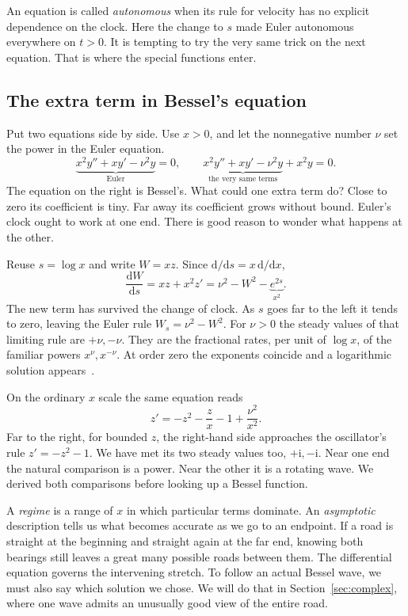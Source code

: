 \documentclass[11pt,a4paper]{amsart}
\newcommand{\dif}{\mathrm{d}}
\newcommand{\ii}{\mathrm{i}}
\theoremstyle{definition}
\theoremstyle{remark}
\begin{document}
An equation is called \emph{autonomous} when its rule for velocity has no explicit dependence on the clock. Here the change to \(s\) made Euler autonomous everywhere on \(t>0\). It is tempting to try the very same trick on the next equation. That is where the special functions enter.

\subsection{The extra term in Bessel's equation}
Put two equations side by side. Use \(x>0\), and let the nonnegative number \(\nu\) set the power in the Euler equation.
\[
 \underbrace{x^2y''+xy'-\nu^2y}_{\text{Euler}}=0,
 \qquad
 \underbrace{x^2y''+xy'-\nu^2y}_{\text{the very same terms}}+x^2y=0.
\]
The equation on the right is Bessel's. What could one extra term do? Close to zero its coefficient is tiny. Far away its coefficient grows without bound. Euler's clock ought to work at one end. There is good reason to wonder what happens at the other.

Reuse \(s=\log x\) and write \(W=xz\). Since \(\dif/\dif s=x\,\dif/\dif x\),
\[
 \frac{\dif W}{\dif s}=xz+x^2z'
       =\nu^2-W^2-\underbrace{e^{2s}}_{x^2}.
\]
The new term has survived the change of clock. As \(s\) goes far to the left it tends to zero, leaving the Euler rule \(W_s=\nu^2-W^2\). For \(\nu>0\) the steady values of that limiting rule are \(+\nu,-\nu\). They are the fractional rates, per unit of \(\log x\), of the familiar powers \(x^\nu,x^{-\nu}\). At order zero the exponents coincide and a logarithmic solution appears~\cite{NISTBessel}.

On the ordinary \(x\) scale the same equation reads
\begin{equation}\label{eq:besselslope}
 z'=-z^2-\frac{z}{x}-1+\frac{\nu^2}{x^2}.
\end{equation}
Far to the right, for bounded \(z\), the right-hand side approaches the oscillator's rule \(z'=-z^2-1\). We have met its two steady values too, \(+\ii,-\ii\). Near one end the natural comparison is a power. Near the other it is a rotating wave. We derived both comparisons before looking up a Bessel function.

A \emph{regime} is a range of \(x\) in which particular terms dominate. An \emph{asymptotic} description tells us what becomes accurate as we go to an endpoint. If a road is straight at the beginning and straight again at the far end, knowing both bearings still leaves a great many possible roads between them. The differential equation governs the intervening stretch. To follow an actual Bessel wave, we must also say which solution we chose. We will do that in Section~\ref{sec:complex}, where one wave admits an unusually good view of the entire road.
\end{document}
